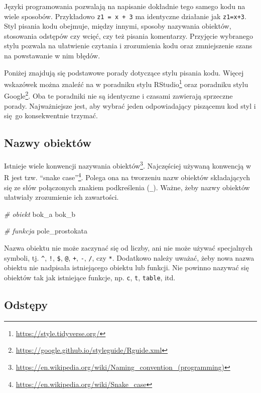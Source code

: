 \documentclass[paper=6in:9in,pagesize=pdftex,headinclude=on,footinclude=on,10pt]{scrbook}
\newenvironment{Shaded}{\begin{snugshade}}{\end{snugshade}}
\newcommand{\CommentTok}[1]{\textcolor[rgb]{0.56,0.35,0.01}{\textit{#1}}}
\newcommand{\NormalTok}[1]{#1}
\DeclareRobustCommand{\href}[2]{#2\footnote{\url{#1}}}
\begin{document}
Języki programowania pozwalają na napisanie dokładnie tego samego kodu na wiele sposobów.
Przykładowo \texttt{z1\ =\ x\ +\ 3} ma identyczne działanie jak \texttt{z1=x+3}.
Styl pisania kodu obejmuje, między innymi, sposoby nazywania obiektów, stosowania odstępów czy wcięć, czy też pisania komentarzy.
Przyjęcie wybranego stylu pozwala na ułatwienie czytania i zrozumienia kodu oraz zmniejszenie szans na powstawanie w nim błędów.

Poniżej znajdują się podstawowe porady dotyczące stylu pisania kodu.
Więcej wskazówek można znaleźć na w \href{https://style.tidyverse.org/}{poradniku stylu RStudio} oraz \href{https://google.github.io/styleguide/Rguide.xml}{poradniku stylu Google}.
Oba te poradniki nie są identyczne i czasami zawierają sprzeczne porady.
Najważniejsze jest, aby wybrać jeden odpowiadający piszącemu kod styl i się~go konsekwentnie trzymać.

\hypertarget{nazwy-obiektow}{%
\subsection{Nazwy obiektów}\label{nazwy-obiektow}}

Istnieje wiele konwencji nazywania obiektów\footnote{\url{https://en.wikipedia.org/wiki/Naming_convention_(programming)}}.
Najczęściej używaną konwencją w R jest tzw. \href{https://en.wikipedia.org/wiki/Snake_case}{``snake case''}.
Polega ona na tworzeniu nazw obiektów składających się ze słów połączonych znakiem podkreślenia (\texttt{\_}).
Ważne, żeby nazwy obiektów ułatwiały zrozumienie ich zawartości.

\begin{Shaded}
\begin{Highlighting}[]
\CommentTok{# obiekt}
\NormalTok{bok_a}
\NormalTok{bok_b}

\CommentTok{# funkcja}
\NormalTok{pole_prostokata}
\end{Highlighting}
\end{Shaded}

Nazwa obiektu nie może zaczynać się od liczby, ani nie może używać specjalnych symboli, tj. \texttt{\^{}}, \texttt{!}, \texttt{\$}, \texttt{@}, \texttt{+}, \texttt{-}, \texttt{/}, czy \texttt{*}.
Dodatkowo należy uważać, żeby nowa nazwa obiektu nie nadpisała istniejącego obiektu lub funkcji.
Nie powinno nazywać się obiektów tak jak istniejące funkcje, np. \texttt{c}, \texttt{t}, \texttt{table}, itd.

\hypertarget{odstepy}{%
\subsection{Odstępy}\label{odstepy}}
\end{document}
